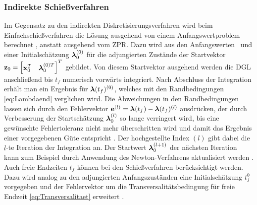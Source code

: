 \subsubsection{Indirekte Schießverfahren}\label{subsubsec:Schießverfahren_indirekt}
Im Gegensatz zu den indirekten Diskretisierungsverfahren wird beim Einfachschießverfahren die Lösung ausgehend von einem Anfangswertproblem berechnet \cite{Papageorgiou.2012}, anstatt ausgehend vom \gls{ZPR}. Dazu wird aus den Anfangswerten \xzero~und einer Initialschätzung $\boldsymbol{\mathrm{\lambda}}_0^{(0)}$ für die adjungierten Zustände der Startvektor $\boldsymbol{\mathrm{z}}_0 = \begin{bmatrix}\boldsymbol{\mathrm{x}}_0^T & \boldsymbol{\mathrm{\lambda}}_0^{(0)T}\end{bmatrix}^T$ gebildet. Von diesem Startvektor ausgehend werden die \gls{DGL} anschließend bis $t_f$ numerisch vorwärts integriert. Nach Abschluss der Integration erhält man ein Ergebnis für $\boldsymbol{\mathrm{\lambda}}(t_f)^{(0)}$, welches mit den Randbedingungen \eqref{eq:Lambdaend} verglichen wird. Die Abweichungen in den Randbedingungen lassen sich durch den Fehlervektor $\boldsymbol{\mathrm{e}}^{(l)} = \boldsymbol{\mathrm{\lambda}}(t_f) - \boldsymbol{\mathrm{\lambda}}(t_f)^{(l)}$ ausdrücken, der durch Verbesserung der Startschätzung $\boldsymbol{\mathrm{\lambda}}_0^{(l)}$ so lange verringert wird, bis eine gewünschte Fehlertoleranz nicht mehr überschritten wird und damit das Ergebnis einer vorgegebenen Güte entspricht \cite{Papageorgiou.2012}. Der hochgestellte Index $(l)$ gibt dabei die $l$-te Iteration der Integration an. Der Startwert $\boldsymbol{\mathrm{\lambda}}_0^{(l+1)}$ der nächsten Iteration kann zum Beispiel durch Anwendung des Newton-Verfahrens aktualisiert werden \cite{Papageorgiou.2012}.
Auch freie Endzeiten $t_f$ können bei den Schießverfahren berücksichtigt werden. Dazu wird analog zu den adjungierten Anfangszuständen eine Initialschätzung $t_f^{0}$ vorgegeben und der Fehlervektor um die Transversalitätsbedingung für freie Endzeit \eqref{eq:Transversalitaet} erweitert \cite{Papageorgiou.2012}.
\newpage
